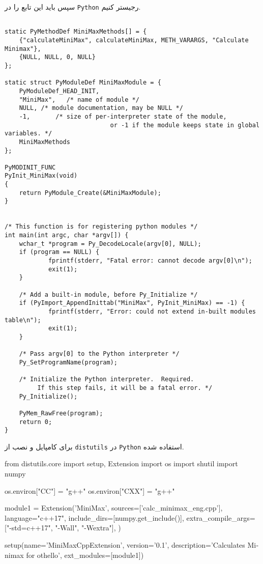  سپس باید این تابع را در
 \verb;Python;
 رجیستر کنیم.

 \begin{latin}
 \begin{lstlisting}
 
static PyMethodDef MiniMaxMethods[] = {
	{"calculateMiniMax", calculateMiniMax, METH_VARARGS, "Calculate Minimax"},
	{NULL, NULL, 0, NULL}
};

static struct PyModuleDef MiniMaxModule = {
	PyModuleDef_HEAD_INIT,
	"MiniMax",   /* name of module */
	NULL, /* module documentation, may be NULL */
	-1,       /* size of per-interpreter state of the module,
							 or -1 if the module keeps state in global variables. */
	MiniMaxMethods
};

PyMODINIT_FUNC
PyInit_MiniMax(void)
{
	return PyModule_Create(&MiniMaxModule);
}


/* This function is for registering python modules */
int main(int argc, char *argv[]) {
	wchar_t *program = Py_DecodeLocale(argv[0], NULL);
	if (program == NULL) {
			fprintf(stderr, "Fatal error: cannot decode argv[0]\n");
			exit(1);
	}

	/* Add a built-in module, before Py_Initialize */
	if (PyImport_AppendInittab("MiniMax", PyInit_MiniMax) == -1) {
			fprintf(stderr, "Error: could not extend in-built modules table\n");
			exit(1);
	}

	/* Pass argv[0] to the Python interpreter */
	Py_SetProgramName(program);

	/* Initialize the Python interpreter.  Required.
		 If this step fails, it will be a fatal error. */
	Py_Initialize();

	PyMem_RawFree(program);
	return 0;
}

 \end{lstlisting}
 \end{latin}
 
 برای کامپایل و نصب از
 \verb;distutils;
 در
 \verb;Python;
 استفاده شده.


\begin{latin}
\begin{python}
from distutils.core import setup, Extension
import os
import shutil
import numpy

os.environ["CC"] = "g++"
os.environ["CXX"] = "g++"


module1 = Extension('MiniMax',
                    sources=['calc_minimax_eng.cpp'],
                    language="c++17",
                    include_dirs=[numpy.get_include()],
                    extra_compile_args=["-std=c++17", "-Wall", "-Wextra"],
                    )

setup(name='MiniMaxCppExtension',
       version='0.1',
       description='Calculates Minimax for othello',
       ext_modules=[module1])
\end{python}
\end{latin}

